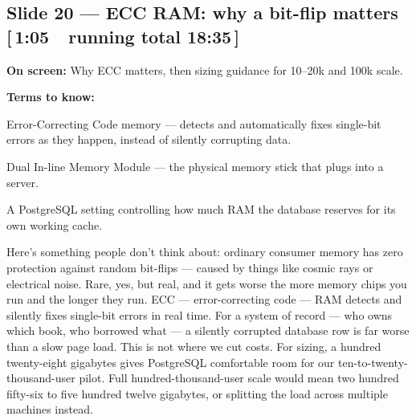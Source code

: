 \documentclass[11pt]{article}
\newcommand{\onscreen}[1]{\noindent\textbf{\color{sovGrey}On screen:} #1\par\vspace{4pt}}
\newcommand{\timing}[2]{\hfill{\normalsize\color{sovGrey}[\,#1\ \textbar\ running total #2\,]}}
\newenvironment{terms}
  {\noindent\textbf{\color{sovGrey}Terms to know:}
   \begin{description}[leftmargin=0pt,style=sameline,labelindent=0pt,itemsep=2pt,topsep=2pt,font=\normalfont\bfseries\color{sovDark}]}
  {\end{description}\vspace{2pt}}
\begin{document}
\subsection*{Slide 20 --- ECC RAM: why a bit-flip matters \timing{1:05}{18:35}}
\onscreen{Why ECC matters, then sizing guidance for 10--20k and 100k scale.}
\begin{terms}
  \item[ECC RAM] Error-Correcting Code memory --- detects and automatically fixes
    single-bit errors as they happen, instead of silently corrupting data.
  \item[DIMM] Dual In-line Memory Module --- the physical memory stick that plugs
    into a server.
  \item[\texttt{shared\_buffers}] A PostgreSQL setting controlling how much RAM the
    database reserves for its own working cache.
\end{terms}
\begin{sayit}
Here's something people don't think about: ordinary consumer memory has zero protection
against random bit-flips --- caused by things like cosmic rays or electrical noise.
Rare, yes, but real, and it gets worse the more memory chips you run and the longer they
run. ECC --- error-correcting code --- RAM detects and silently fixes single-bit errors
in real time. For a system of record --- who owns which book, who borrowed what --- a
silently corrupted database row is far worse than a slow page load. This is not where we
cut costs. For sizing, a hundred twenty-eight gigabytes gives PostgreSQL comfortable
room for our ten-to-twenty-thousand-user pilot. Full hundred-thousand-user scale would
mean two hundred fifty-six to five hundred twelve gigabytes, or splitting the load
across multiple machines instead.
\end{sayit}
\end{document}
